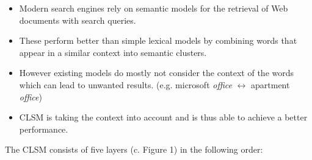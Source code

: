 \begin{multicols*}{3}

%


\begin{itemize}

\item Modern search engines rely on semantic models for the retrieval of Web documents with search queries.

\item These perform better than simple lexical models by combining words that appear in a similar context into semantic clusters.

\item However existing models do mostly not consider the context of the words which can lead to unwanted results. (e.g. microsoft \textit{office} $\leftrightarrow$ apartment \textit{office})

\item CLSM is taking the context into account and is thus able to achieve a better performance.

\end{itemize}


The CLSM consists of five layers (c. Figure 1) in the following order:\\
\vspace{20mm}
	
	

\end{multicols*}
